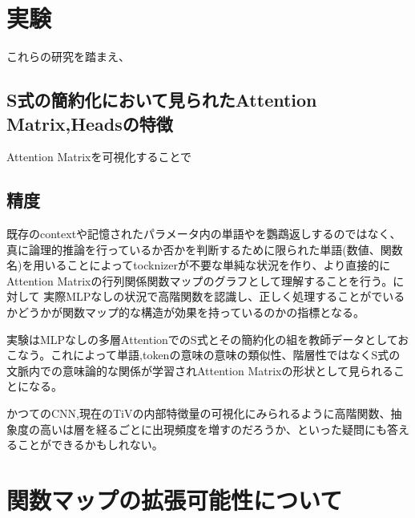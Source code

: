 \documentclass[a4paper,11pt]{article}
\begin{document}
\section{実験}
これらの研究を踏まえ、
\subsection{S式の簡約化において見られたAttention Matrix,Headsの特徴}
Attention Matrixを可視化することで
\subsection{精度}
既存のcontextや記憶されたパラメータ内の単語やを鸚鵡返しするのではなく、真に論理的推論を行っているか否かを判断するために限られた単語(数値、関数名)を用いることによってtocknizerが不要な単純な状況を作り、より直接的にAttention Matrixの行列関係関数マップのグラフとして理解することを行う。に対して
実際MLPなしの状況で高階関数を認識し、正しく処理することがでいるかどうかが関数マップ的な構造が効果を持っているのかの指標となる。

実験はMLPなしの多層AttentionでのS式とその簡約化の組を教師データとしておこなう。これによって単語,tokenの意味の意味の類似性、階層性ではなくS式の文脈内での意味論的な関係が学習されAttention Matrixの形状として見られることになる。

かつてのCNN,現在のTiVの内部特徴量の可視化にみられるように高階関数、抽象度の高いは層を経るごとに出現頻度を増すのだろうか、といった疑問にも答えることができるかもしれない。


\section{関数マップの拡張可能性について}

\begin{abstract}
関数マップの拡張例としては
\begin{itemize}
    \item ε演算の変更 例えば$f'=af(f(x/a))$のような積の形を用いる
    \item x(関数の定義域、値域)を１次元から高次元に拡張
    \item 一回で複数の関数適用$\cdot$を行う
    \item 多値関数、確率分布に値を持つ関数(確率過程)への拡張
    \item 定義域、値域の空間の変更(多次元トーラスなど)
\end{itemize}
などが考えられる。このようなあり得る拡張を包括するような概念、手法を考えたい。
\end{abstract} 
    
\end{document}
